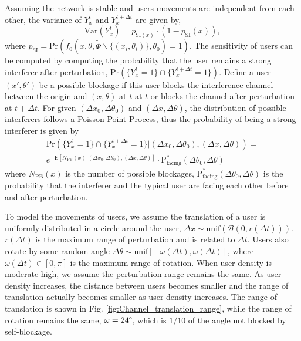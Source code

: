 \documentclass[10pt, conference, letterpaper]{IEEEtran}
\begin{document}
Assuming the network is stable and users movements are independent from each other, the variance of $Y_x^t$ and $Y_x^{t+\Delta t}$ are given by,
\begin{equation*}
\mathrm{Var}(Y_x^t)=p_{\mathrm{SI}(x)}\cdot (1-p_{\mathrm{SI}}(x)),
\end{equation*}
where $p_{\mathrm{SI}}=\mathrm{Pr}(f_0(x,\theta,\tilde{\Phi}\backslash\{(x_i,\theta_i)\}, \theta_0)=1)$. 
The sensitivity of users can be computed by computing the probability that the user remains a strong interferer after perturbation, $\mathrm{Pr}(\{Y_x^t=1\}\cap \{Y_x^{t+\Delta t}=1\})$. Define a user $(x',\theta')$ be a possible blockage if this user blocks the interference channel between the origin and $(x,\theta)$ at $t$ at $t$ or blocks the channel after perturbation at $t+\Delta t$. For given $(\Delta x_0, \Delta\theta_0)$ and $(\Delta x, \Delta\theta)$, the distribution of possible interferers follows a Poisson Point Process, thus the probability of being a strong interferer is given by
\begin{multline}
\mathrm{Pr}(\{Y_x^t=1\}\cap \{Y_x^{t+\Delta t}=1\}|(\Delta x_0, \Delta \theta_0), (\Delta x, \Delta\theta))=\\
e^{-\mathrm{E}[N_{\mathrm{PB}}(x)|(\Delta x_0, \Delta \theta_0), (\Delta x, \Delta\theta)]}\cdot
\mathrm{P}_{\mathrm{facing}}^{\ast}(\Delta \theta_0, \Delta\theta)
\end{multline}
where $N_{\mathrm{PB}}(x)$ is the number of possible blockages, $\mathrm{P}_{\mathrm{facing}}^{\ast}(\Delta \theta_0, \Delta\theta)$ is the probability that the interferer and the typical user are facing each other before and after perturbation. 

To model the movements of users, we assume the translation of a user is uniformly distributed in a circle around the user, $\Delta x \sim \mathrm{unif}(\mathcal{B}(0, r(\Delta t)))$. $r(\Delta t)$ is the maximum range of perturbation and is related to $\Delta t$. Users also rotate by some random angle $\Delta \theta \sim \mathrm{unif}[-\omega(\Delta t), \omega(\Delta t)]$, where $\omega(\Delta t)\in[0,\pi]$ is the maximum range of rotation. When user density is moderate high, we assume the perturbation range remains the same. As user density increases, the distance between users becomes smaller and the range of translation actually becomes smaller as user density increases. The range of translation is shown in Fig. \ref{fig:Channel_translation_range}, while the range of rotation remains the same, $\omega=24\degree$, which is $1/10$ of the angle not blocked by self-blockage.
\end{document}
